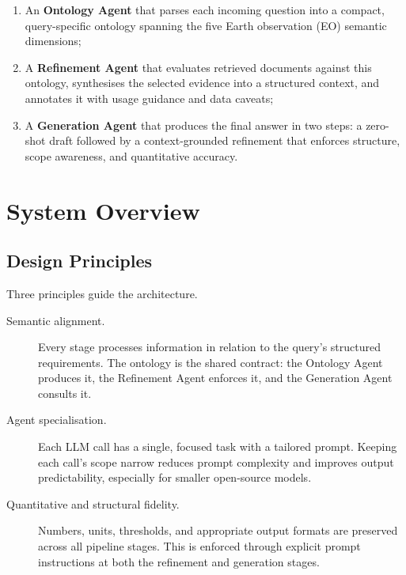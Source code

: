 \begin{enumerate}
\item An \textbf{Ontology Agent} that parses each incoming question into a compact, query-specific ontology spanning the five Earth observation (EO) semantic dimensions;
\item A \textbf{Refinement Agent} that evaluates retrieved documents against this ontology, synthesises the selected evidence into a structured context, and annotates it with usage guidance and data caveats;
\item A \textbf{Generation Agent} that produces the final answer in two steps: a zero-shot draft followed by a context-grounded refinement that enforces structure, scope awareness, and quantitative accuracy.
\end{enumerate}

\section{System Overview}
\label{sec:system-overview}

\subsection{Design Principles}
\label{subsec:design-principles}

Three principles guide the architecture.

\begin{description}
\item[Semantic alignment.] Every stage processes information in relation to the query's structured requirements. The ontology is the shared contract: the Ontology Agent produces it, the Refinement Agent enforces it, and the Generation Agent consults it.

\item[Agent specialisation.] Each LLM call has a single, focused task with a tailored prompt. Keeping each call's scope narrow reduces prompt complexity and improves output predictability, especially for smaller open-source models.

\item[Quantitative and structural fidelity.] Numbers, units, thresholds, and appropriate output formats are preserved across all pipeline stages. This is enforced through explicit prompt instructions at both the refinement and generation stages.
\end{description}


